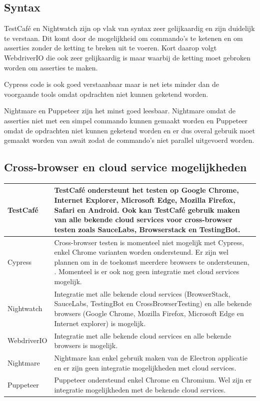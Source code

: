 \subsection{Syntax}
TestCafé en Nightwatch zijn op vlak van syntax zeer gelijkaardig en zijn duidelijk te verstaan. Dit komt door de mogelijkheid om commando's te ketenen en om \glspl{assertie} zonder de ketting te breken uit te voeren. Kort daarop volgt WebdriverIO die ook zeer gelijkaardig is maar waarbij de ketting moet gebroken worden om \glspl{assertie} te maken.

Cypress code is ook goed verstaanbaar maar is net iets minder dan de voorgaande \glspl{tool} omdat opdrachten niet kunnen geketend worden.

Nightmare en Puppeteer zijn het minst goed leesbaar. Nightmare omdat de \glspl{assertie} niet met een simpel commando kunnen gemaakt worden en Puppeteer omdat de opdrachten niet kunnen geketend worden en er dus overal gebruik moet gemaakt worden van await zodat de commando's niet parallel uitgevoerd worden.

\subsection{Cross-browser en cloud service mogelijkheden}
\begin{tabular}{ | l | p{12cm} | }
\hline
 TestCafé & TestCafé ondersteunt het testen op Google Chrome, Internet Explorer, Microsoft Edge, Mozilla Firefox, Safari en Android. Ook kan TestCafé gebruik maken van alle bekende cloud services voor cross-browser testen zoals SauceLabs, Browserstack en TestingBot.\\
\hline
 Cypress & Cross-browser testen is momenteel niet mogelijk met Cypress, enkel Chrome varianten worden ondersteund. Er zijn wel plannen om in de toekomst meerdere browsers te ondersteunen, \textcite{Mann2017}. Momenteel is er ook nog geen integratie met cloud services mogelijk.\\
\hline
 Nightwatch & Integratie met alle bekende cloud services (BrowserStack, SauceLabs, TestingBot en CrossBrowserTesting) en alle bekende browsers (Google Chrome, Mozilla Firefox, Microsoft Edge en Internet explorer) is mogelijk.\\
\hline
 WebdriverIO & Integratie met alle bekende cloud services en alle bekende browsers is mogelijk.\\
\hline
 Nightmare & Nightmare kan enkel gebruik maken van de Electron applicatie en er zijn geen integratie mogelijkheden met cloud services.\\
\hline
 Puppeteer & Puppeteer ondersteund enkel Chrome en Chromium. Wel zijn er integratie mogelijkheden met de bekende cloud services.\\
\hline
\end{tabular}

